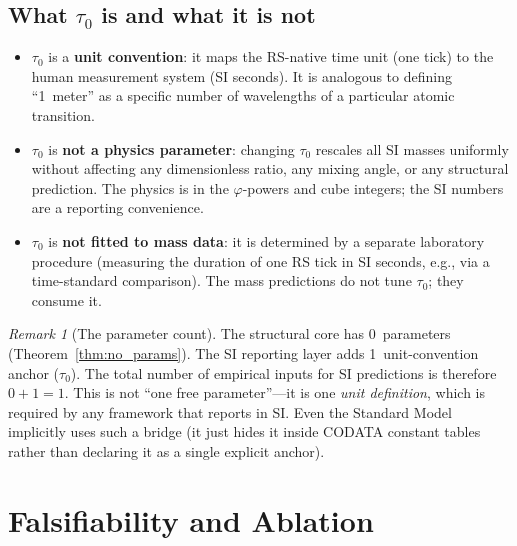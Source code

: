 \documentclass[11pt,a4paper]{article}
\theoremstyle{definition}
\theoremstyle{remark}
\newtheorem{remark}[theorem]{Remark}
\newcommand{\phig}{\varphi}
\begin{document}
\subsection{What $\tau_0$ is and what it is not}

\begin{itemize}[nosep]
  \item $\tau_0$ is a \textbf{unit convention}: it maps the RS-native time
        unit (one tick) to the human measurement system (SI seconds).  It is
        analogous to defining ``1~meter'' as a specific number of wavelengths
        of a particular atomic transition.

  \item $\tau_0$ is \textbf{not a physics parameter}: changing $\tau_0$
        rescales all SI masses uniformly without affecting any dimensionless
        ratio, any mixing angle, or any structural prediction.  The physics
        is in the $\phig$-powers and cube integers; the SI numbers are a
        reporting convenience.

  \item $\tau_0$ is \textbf{not fitted to mass data}: it is determined by a
        separate laboratory procedure (measuring the duration of one RS tick
        in SI seconds, e.g., via a time-standard comparison).  The mass
        predictions do not tune $\tau_0$; they consume it.
\end{itemize}

\begin{remark}[The parameter count]
\label{rem:parameter_count}
The structural core has 0~parameters (Theorem~\ref{thm:no_params}).  The SI
reporting layer adds 1~unit-convention anchor ($\tau_0$).  The total number
of empirical inputs for SI predictions is therefore $0 + 1 = 1$.  This
is not ``one free parameter''---it is one \emph{unit definition}, which is
required by any framework that reports in SI.  Even the Standard Model
implicitly uses such a bridge (it just hides it inside CODATA constant
tables rather than declaring it as a single explicit anchor).
\end{remark}


\section{Falsifiability and Ablation}
\label{sec:falsifiability}
\end{document}
